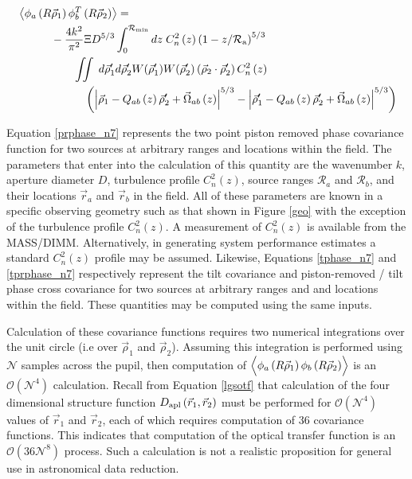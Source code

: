 \begin{equation}\label{tprphase_n7}
\begin{aligned}
&\left\langle \phi_{a}\left(R\vec{\rho}_{1}\right) \phi^{T}_{b}\left(R\vec{\rho}_{2}\right)\right\rangle = \\
&\quad\quad\quad
-\frac{4k^{2}}{\pi^{2}} 
\Xi D^{5/3}
\int_{0}^{\mathcal{R}_{\rm min}} dz\;C_{n}^{2}\left(z\right) \left(1 - z/\mathcal{R}_{\rm a}\right)^{5/3}\\
& \quad\quad\quad\quad\quad
\iint  \; d\vec{\rho}^{\prime}_{1}d\vec{\rho}^{\prime}_{2} W(\vec{\rho}^{\prime}_{1}) W(\vec{\rho}^{\prime}_{2})
\left(\vec{\rho}_{2} \cdot \vec{\rho}^{\prime}_{2}\right)
C_{n}^{2}\left(z\right) 
\\
&\quad\quad\quad\quad\quad\quad
\left(
\left\vert \vec{\rho}_{1} - Q_{ab}\left(z\right)\vec{\rho}^{\prime}_{2} + \vec{\Omega}_{ab}\left(z\right) \right\vert^{5/3}
- \left\vert \vec{\rho}^{\prime}_{1}  -  Q_{ab}\left(z\right)\vec{\rho}^{\prime}_{2} + \vec{\Omega}_{ab}\left(z\right)  \right\vert^{5/3}
\right)
\end{aligned}
\end{equation}

Equation \ref{prphase_n7} represents the two point piston removed
phase covariance function for two sources at arbitrary ranges and
locations within the field.  The parameters that enter into the
calculation of this quantity are the wavenumber $k$, aperture diameter
$D$, turbulence profile $C_{n}^{2}(z)$, source ranges
$\mathcal{R}_{a}$ and $\mathcal{R}_{b}$, and their locations
$\vec{r}_{a}$ and $\vec{r}_{b}$ in the field.  All of
these parameters are known in a specific observing geometry such as
that shown in Figure \ref{geo} with the exception of the turbulence
profile $C_{n}^{2}(z)$.  A measurement of $C_{n}^{2}(z)$ is available
from the MASS/DIMM.  Alternatively, in generating system performance
estimates a standard $C_{n}^{2}(z)$ profile may be assumed.  Likewise,
Equations \ref{tphase_n7} and \ref{tprphase_n7} respectively represent
the tilt covariance and piston-removed / tilt phase cross covariance
for two sources at arbitrary ranges and and locations within the
field.  These quantities may be computed using the same inputs.

Calculation of these covariance functions requires two numerical
integrations over the unit circle (i.e over $\vec{\rho}_{1}$
and $\vec{\rho}_{2}$).  Assuming this integration is performed
using $\mathcal{N}$ samples across the pupil, then computation of
$\left\langle \vphantom{\hat{\phi}_{a}}
\phi_{a}\left(R\vec{\rho}_{1}\right)
\phi_{b}\left(R\vec{\rho}_{2}\right)\right\rangle$ is an
$\mathcal{O}(\mathcal{N}^{4})$ calculation.  Recall from Equation
\ref{lgsotf} that calculation of the four dimensional structure
function $D_{\rm apl}\left(\vec{r}_{1},
\vec{r}_{2}\right)$ must be performed for
$\mathcal{O}(\mathcal{N}^{4})$ values of $\vec{r}_{1}$ and
$\vec{r}_{2}$, each of which requires computation of 36
covariance functions.  This indicates that computation of the optical
transfer function is an $\mathcal{O}(36\mathcal{N}^{8})$ process.
Such a calculation is not a realistic proposition for general use in
astronomical data reduction.

